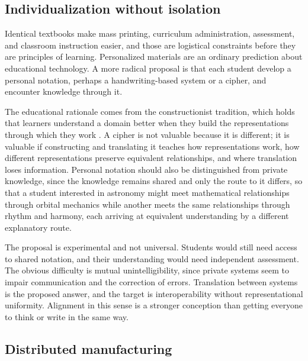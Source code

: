 \documentclass[11pt]{article}
\begin{document}
\subsection{Individualization without isolation}

Identical textbooks make mass printing, curriculum administration, assessment, and classroom instruction easier, and those are logistical constraints before they are principles of learning. Personalized materials are an ordinary prediction about educational technology. A more radical proposal is that each student develop a personal notation, perhaps a handwriting-based system or a cipher, and encounter knowledge through it.

The educational rationale comes from the constructionist tradition, which holds that learners understand a domain better when they build the representations through which they work \cite{papert1980}. A cipher is not valuable because it is different; it is valuable if constructing and translating it teaches how representations work, how different representations preserve equivalent relationships, and where translation loses information. Personal notation should also be distinguished from private knowledge, since the knowledge remains shared and only the route to it differs, so that a student interested in astronomy might meet mathematical relationships through orbital mechanics while another meets the same relationships through rhythm and harmony, each arriving at equivalent understanding by a different explanatory route.

The proposal is experimental and not universal. Students would still need access to shared notation, and their understanding would need independent assessment. The obvious difficulty is mutual unintelligibility, since private systems seem to impair communication and the correction of errors. Translation between systems is the proposed answer, and the target is interoperability without representational uniformity. Alignment in this sense is a stronger conception than getting everyone to think or write in the same way.

\subsection{Distributed manufacturing}
\end{document}
